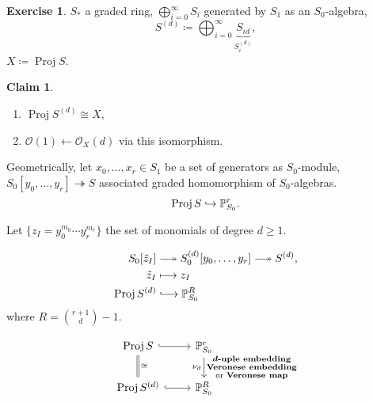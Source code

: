 \documentclass[12pt]{article}
\DeclareMathOperator{\Proj}{Proj}
\theoremstyle{definition}
\newtheorem*{claim}{Claim}
\newtheorem*{exercise}{Exercise}
\begin{document}
\begin{exercise}
$S_*$ a graded ring, $\bigoplus_{i=0}^{\infty}S_i$ generated by $S_1$ as an $S_0$-algebra,
\[S^{(d)}\coloneqq\bigoplus_{i=0}^{\infty}\underbrace{S_{id}}_{S_i^{(d)}},\]
$X\coloneqq\Proj S$.

\begin{claim}
\begin{enumerate}[label=\arabic*)]
\item $\Proj S^{(d)}\cong X$,
\item $\mathcal{O}(1)\leftarrow\mathcal{O}_X(d)$ via this isomorphism.
\end{enumerate}
\end{claim}

Geometrically, let $x_0,\ldots,x_r\in S_1$ be a set of generators as $S_0$-module, $S_0[y_0,\ldots,y_r]\twoheadrightarrow S$ associated graded homomorphism of $S_0$-algebras.
\[\Proj S\lhook\joinrel\rightarrow\mathbb{P}_{S_0}^r.\]

Let $\{z_I=y_0^{m_0}\cdots y_r^{m_r}\}$ the set of monomials of degree $d\geq1$.

\begin{align*}
S_0[\tilde{z}_I]&\relbar\joinrel\twoheadrightarrow S_0^{(d)}[y_0,\ldots,y_r]\relbar\joinrel\twoheadrightarrow S^{(d)},\\
\tilde{z}_I&\longmapsto z_I\\
\Proj S^{(d)}&\lhook\joinrel\longrightarrow\mathbb{P}_{S_0}^R
\end{align*}
where $R=\binom{r+1}{d}-1$.

\[
\begin{tikzcd}
\Proj S\arrow[r,hook]\arrow[d,-,double equal sign distance,double,"\cong"]&\mathbb{P}_{S_0}^r\arrow[d,"\substack{\boldsymbol{d}\text{\textbf{-uple embedding}}\\\text{\textbf{Veronese embedding}}\\\text{or \textbf{Veronese map}}}","\nu_d"']\\
\Proj S^{(d)}\arrow[r,hook]&\mathbb{P}_{S_0}^R
\end{tikzcd}
\]
\end{exercise}
\end{document}
